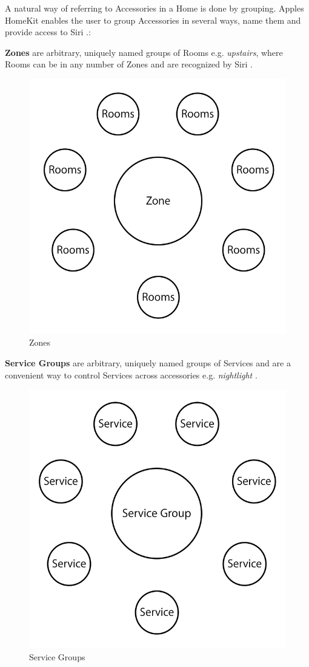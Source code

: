			A natural way of referring to Accessories in a Home is done by grouping. Apples HomeKit enables the user to group Accessories in several ways, name them and provide access to Siri \parencite{IntroToHomeKit}.:

			\textbf{Zones} are arbitrary, uniquely named groups of Rooms e.g. \textit{upstairs}, where Rooms can be in any number of Zones and are recognized by Siri \parencite{IntroToHomeKit}. 

			\begin{figure}[h]
				\centering
					\includegraphics[width=.5\textwidth]{images/theory/Zones.png}
				\caption{Zones \parencite{IntroToHomeKit}}
				\label{fig:Homekit_Database}
			\end{figure}

			\textbf{Service Groups}  are arbitrary, uniquely named groups of Services and are a convenient way to control Services across accessories e.g. \textit{nightlight} \parencite{IntroToHomeKit}.

			\begin{figure}[h]
				\centering
					\includegraphics[width=.5\textwidth]{images/theory/Service_Groups.png}
				\caption{Service Groups \parencite{IntroToHomeKit}}
				\label{fig:Homekit_Database}
			\end{figure}

